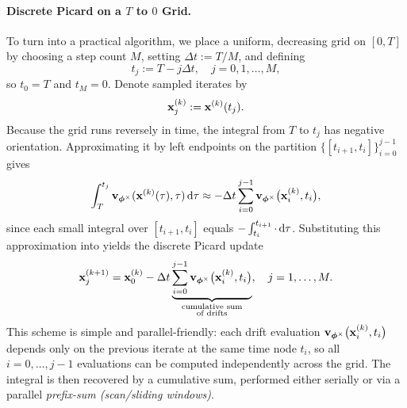 \paragraph{Discrete Picard on a $T$ to $0$ Grid.}
To turn  into a practical algorithm, we place a
uniform, decreasing grid on $[0,T]$ by choosing a step count $M$, setting
$\Delta t := T/M$, and defining
\[
t_j := T - j \Delta t,
\quad j=0,1,\ldots,M,
\]
so $t_0=T$ and $t_M=0$. Denote sampled iterates by
\[
{\mathbf{x}}^{(k)}_j := {\mathbf{x}}^{(k)}(t_j).
\]
Because the grid runs reversely in time, the
integral from $T$ to $t_j$ has negative orientation. Approximating it by
left endpoints on the partition $\{[t_{i+1},t_i]\}_{i=0}^{j-1}$ gives
\[
\int_{T}^{t_j}{\mathbf{v}}_{{\bm{\phi}}^\times}({\mathbf{x}}^{(k)}(\tau), \tau) \mathop{}\!\mathrm{d}\tau
 \approx 
- \Delta t \sum_{i=0}^{j-1} {\mathbf{v}}_{{\bm{\phi}}^\times}\big({\mathbf{x}}^{(k)}_{i}, t_i\big),
\]
since each small integral over $[t_{i+1},t_i]$ equals
$- \int_{t_i}^{t_{i+1}} \cdot\mathop{}\!\mathrm{d}\tau$. Substituting this approximation
into  yields the discrete Picard update
\begin{equation}\label{eq:discrete_picard_decreasing}
    {\mathbf{x}}^{(k+1)}_j
    =
    {\mathbf{x}}^{(k)}_0
    - \Delta t 
    \underbrace{\sum_{i=0}^{j-1} {\mathbf{v}}_{{\bm{\phi}}^\times} \big({\mathbf{x}}^{(k)}_i, t_i\big)}_{
        \substack{\text{cumulative sum}\\ \text{of drifts}}
    },
    \quad j=1,\ldots,M.
\end{equation}
This scheme is simple and parallel-friendly: each drift evaluation
${\mathbf{v}}_{{\bm{\phi}}^\times} \big({\mathbf{x}}^{(k)}_i,t_i\big)$ depends only on the previous
iterate at the same time node $t_i$, so all $i=0,\dots,j - 1$
evaluations can be computed independently across the grid. The integral is then
recovered by a cumulative sum, performed either serially or via a parallel
\emph{prefix-sum (scan/sliding windows)}.


